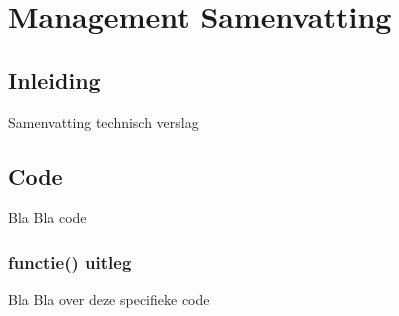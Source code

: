 \chapter{Management Samenvatting}
\section{Inleiding}
Samenvatting technisch verslag
\newpage

\section{Code}
Bla Bla code

\subsection{functie() uitleg}
Bla Bla over deze specifieke code